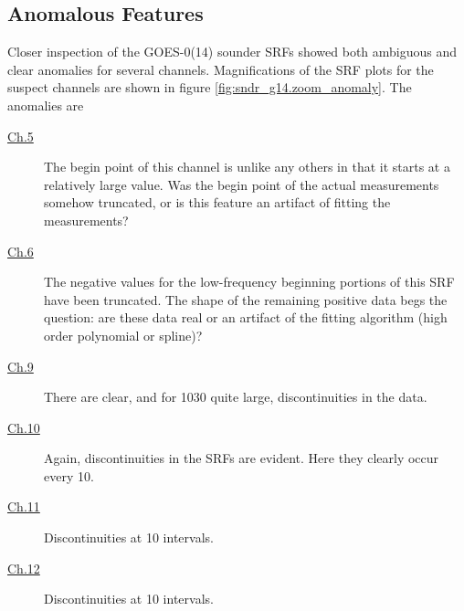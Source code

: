 \subsection{Anomalous Features}
Closer inspection of the GOES-0(14) sounder SRFs showed both ambiguous and clear anomalies for several channels. Magnifications of the SRF plots for the suspect channels are shown in figure \ref{fig:sndr_g14.zoom_anomaly}. The anomalies are
\begin{description}
  \item[{\hyperref[fig:sndr_g14.zoom_anomaly]{Ch.5}}] The begin point of this channel is unlike any others in that it starts at a relatively large value. Was the begin point of the actual measurements somehow truncated, or is this feature an artifact of fitting the measurements?
  \item[{\hyperref[fig:sndr_g14.zoom_anomaly]{Ch.6}}] The negative values for the low-frequency beginning portions of this SRF have been truncated. The shape of the remaining positive data begs the question: are these data real or an artifact of the fitting algorithm (high order polynomial or spline)?
  \item[{\hyperref[fig:sndr_g14.zoom_anomaly]{Ch.9}}] There are clear, and for 1030\invcm{} quite large, discontinuities in the data.
  \item[{\hyperref[fig:sndr_g14.zoom_anomaly]{Ch.10}}] Again, discontinuities in the SRFs are evident. Here they clearly occur every 10\invcm.
  \item[{\hyperref[fig:sndr_g14.zoom_anomaly]{Ch.11}}] Discontinuities at 10\invcm{} intervals.
  \item[{\hyperref[fig:sndr_g14.zoom_anomaly]{Ch.12}}] Discontinuities at 10\invcm{} intervals.
\end{description}

